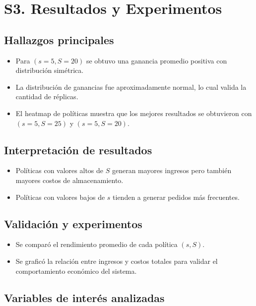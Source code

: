 \documentclass{report}
\begin{document}
\section*{S3. Resultados y Experimentos}

\subsection*{Hallazgos principales}

\begin{itemize}
\item Para \((s=5, S=20)\) se obtuvo una ganancia promedio positiva con distribución simétrica.
\item La distribución de ganancias fue aproximadamente normal, lo cual valida la cantidad de réplicas.
\item El heatmap de políticas muestra que los mejores resultados se obtuvieron con \((s=5, S=25)\) y \((s=5, S=20)\).
\end{itemize}

\subsection*{Interpretación de resultados}

\begin{itemize}
\item Políticas con valores altos de \(S\) generan mayores ingresos pero también mayores costos de almacenamiento.
\item Políticas con valores bajos de \(s\) tienden a generar pedidos más frecuentes.
\end{itemize}

\subsection*{Validación y experimentos}

\begin{itemize}
\item Se comparó el rendimiento promedio de cada política \((s, S)\).
\item Se graficó la relación entre ingresos y costos totales para validar el comportamiento económico del sistema.
\end{itemize}

\subsection*{Variables de interés analizadas}
\end{document}
